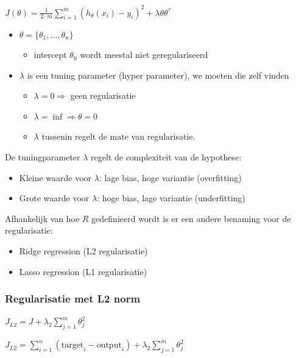 \documentclass{article}
\begin{document}
\begin{center}
    $J(\theta) = \frac{1}{2\cdot m} \sum_{i=1}^m (h_{\theta}(x_i) - y_i)^2 + \lambda \theta \theta^{\tau}$
\end{center}

\begin{itemize}
    \item $\theta = \{\theta_1, \dots, \theta_n\}$
    \begin{itemize}
        \item intercept $\theta_0$ wordt meestal niet geregulariseerd
    \end{itemize}
    \item $\lambda$ is een tuning parameter (hyper parameter), we moeten die zelf vinden
    \begin{itemize}
        \item $\lambda = 0 \Rightarrow$ geen regularisatie
        \item $\lambda = \inf \Rightarrow \theta = 0$ 
        \item $\lambda$ tussenin regelt de mate van regularisatie.
    \end{itemize}
\end{itemize}

De tuningparameter $\lambda$ regelt de complexiteit van de hypothese:

\begin{itemize}
    \item Kleine waarde voor $\lambda$: lage bias, hoge variantie (overfitting)
    \item Grote waarde voor $\lambda$: hoge bias, lage variantie (underfitting)
\end{itemize}

Afhankelijk van hoe $R$ gedefinieerd wordt is er een andere benaming voor de regularisatie:

\begin{itemize}
    \item Ridge regression (L2 regularisatie)
    \item Lasso regression (L1 regularisatie)
\end{itemize}

\subsubsection{Regularisatie met L2 norm}

\begin{center}
$J_{L2} = J + \lambda_2 \sum_{j=1}^m \theta_j^2$

$J_{L2} = \sum_{i=1}^n (\text{target}_i - \text{output}_i) + \lambda_2 \sum_{j=1}^m \theta_j^2$
\end{center}
\end{document}
